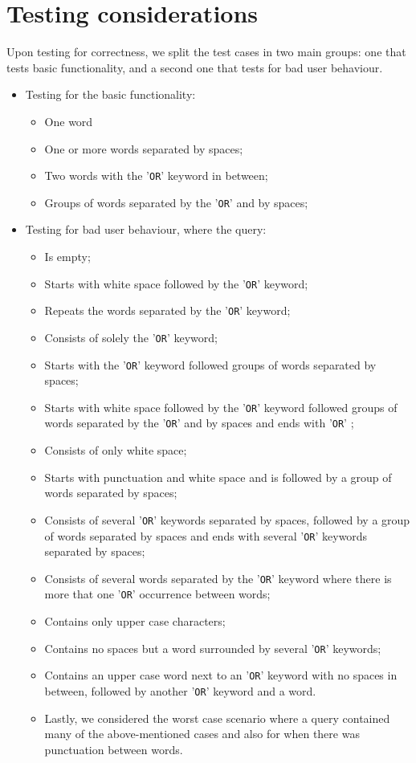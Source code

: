 \section{Testing considerations} %
Upon testing for correctness, we split the test cases in two main groups: one that tests basic functionality, and a second one that tests for bad user behaviour.
\begin{itemize}
    \item Testing for the basic functionality:
        \begin{itemize}
            \item One word
            \item One or more words separated by spaces;
            \item Two words with the '{\tt OR}' keyword in between;
            \item Groups of words separated by the '{\tt OR}' and by spaces;
        \end{itemize}
    \item Testing for bad user behaviour, where the query:
    \begin{itemize}
        \item Is empty;
        \item Starts with white space followed by the '{\tt OR}' keyword;
        \item Repeats the words separated by the '{\tt OR}' keyword;
        \item Consists of solely the '{\tt OR}' keyword;
        \item Starts with the '{\tt OR}' keyword followed groups of words separated by spaces;
        \item Starts with white space followed by the '{\tt OR}' keyword followed groups of words separated by the '{\tt OR}' and by spaces and ends with '{\tt OR}' ;
        \item Consists of only white space;
        \item Starts with punctuation and white space and is followed by a group of words separated by spaces;
        \item Consists of several '{\tt OR}' keywords separated by spaces, followed by a group of words separated by spaces and ends with several '{\tt OR}' keywords separated by spaces;
        \item Consists of several words separated by the '{\tt OR}' keyword where there is more that one '{\tt OR}' occurrence between words;
        \item Contains only upper case characters;
        \item Contains no spaces but a word surrounded by several '{\tt OR}' keywords;
        \item Contains an upper case word next to an '{\tt OR}' keyword with no spaces in between, followed by another '{\tt OR}' keyword and a word.
        \item Lastly, we considered the worst case scenario where a query contained many of the above-mentioned cases and also for when there was punctuation between words.
    \end{itemize}
\end{itemize}

